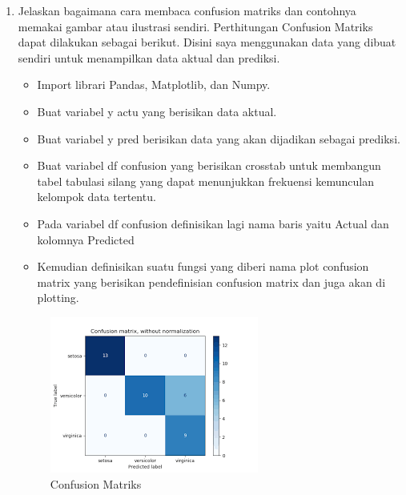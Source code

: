 \begin{enumerate}
\item Jelaskan bagaimana cara membaca confusion matriks dan contohnya memakai gambar atau ilustrasi sendiri.
Perthitungan Confusion Matriks dapat dilakukan sebagai berikut. Disini saya menggunakan data yang dibuat sendiri untuk menampilkan data aktual dan prediksi.
\begin{itemize}
\item
Import librari Pandas, Matplotlib, dan Numpy.
\item
Buat variabel y actu yang berisikan data aktual.
\item
Buat variabel y pred berisikan data yang akan dijadikan sebagai prediksi.
\item
Buat variabel df confusion yang berisikan crosstab untuk membangun tabel tabulasi silang yang dapat menunjukkan frekuensi kemunculan kelompok data tertentu.
\item
Pada variabel df confusion definisikan lagi nama baris yaitu Actual dan kolomnya Predicted
\item
Kemudian definisikan suatu fungsi yang diberi nama plot confusion matrix yang berisikan pendefinisian confusion matrix dan juga akan di plotting.

\end{itemize}
\begin{figure}[ht]
\centering
\includegraphics[scale=0.5]{figures/1174012/3/1.png}
\caption{Confusion Matriks}
\label{contoh}
\end{figure}


\end{enumerate}

